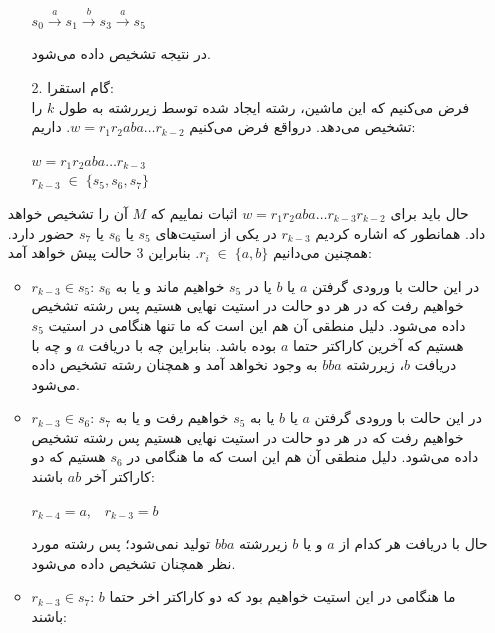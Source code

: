 \begin{enumerate}
\begin{enumerate}
\begin{center}
        $s_0 \xrightarrow{a} s_1 \xrightarrow{b} s_3
        \xrightarrow{a} s_5$
    \end{center}
    در نتیجه تشخیص داده می‌شود.
    \\[0.05in]
    \item[2.] گام استقرا:\\[0.1in]
    فرض می‌کنیم که این ماشین، رشته ایجاد شده توسط زیررشته به طول $k$ را تشخیص می‌دهد.
    درواقع فرض می‌کنیم $w = r_1r_2aba\ldots r_{k-2}$. داریم:\\[0.1in]
    \begin{center}
        $w = r_1r_2aba\ldots r_{k-3}$\\[0.07in]
        $r_{k-3}\;\in\;\{s_5,s_6,s_7\}$\\[0.15in]
    \end{center}
\end{enumerate}
حال باید برای $w = r_1r_2aba\ldots r_{k-3}r_{k-2}$ اثبات نماییم که $M$ آن را تشخیص خواهد داد.
همانطور که اشاره کردیم $r_{k-3}$ در یکی از استیت‌های $s_5$ یا $s_6$ یا $s_7$
حضور دارد. همچنین می‌دانیم $r_i\;\in\;\{a,b\}$. بنابراین 3 حالت پیش خواهد آمد:
\newline
\begin{itemize}
    \item $r_{k-3}\in s_5$:
    در این حالت با ورودی گرفتن $a$ یا $b$ یا در $s_5$ خواهیم ماند و یا به $s_6$ خواهیم رفت که در هر دو حالت در استیت نهایی هستیم پس رشته تشخیص داده می‌شود.
    دلیل منطقی آن هم این است که ما تنها هنگامی در استیت $s_5$ هستیم که آخرین کاراکتر حتما $a$ بوده باشد. بنابراین چه با دریافت $a$ و چه با دریافت $b$، زیررشته $bba$ به وجود نخواهد آمد و همچنان رشته تشخیص داده می‌شود.
    \item $r_{k-3}\in s_6$:
    در این حالت با ورودی گرفتن $a$ یا $b$ یا به $s_5$ خواهیم رفت و یا به $s_7$ خواهیم رفت که در هر دو حالت در استیت نهایی هستیم پس رشته تشخیص داده می‌شود.
    دلیل منطقی آن هم این است که ما هنگامی در $s_6$ هستیم که دو کاراکتر آخر $ab$ باشند:
    \\[0.05in]
    \begin{center}
        $r_{k-4} = a,\;\;\;r_{k-3} = b$\\[0.1in]
    \end{center}
    حال با دریافت هر کدام از $a$ و یا $b$ زیررشته $bba$ تولید نمی‌شود؛ پس رشته مورد نظر همچنان تشخیص داده می‌شود.
    \item $r_{k-3}\in s_7$:
    ما هنگامی در این استیت خواهیم بود که دو کاراکتر اخر حتما $b$ باشند:
    \\[0.05in]
    \begin{center}

\end{center}
\end{itemize}
\end{enumerate}
